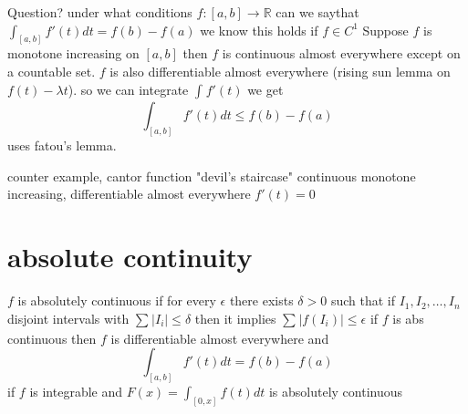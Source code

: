 \documentclass[11pt]{article}
\begin{document}
Question? under what conditions $f : [a,b] \rightarrow \mathbb{R}$ can we saythat $\int_{[a,b]}^{}f'(t)dt = f(b) - f(a)$ we know this holds if $f \in C^{1}$
Suppose $f$ is monotone increasing on $[a,b]$ then  $f$ is continuous almost everywhere except on a countable set. $f$ is also differentiable almost everywhere (rising sun lemma on $f(t) - \lambda t$).
so we can integrate $\int_{}^{}f'(t)$ we get
\[
    \int_{[a,b]}^{}f'(t)dt \le f(b) - f(a)
\] 
uses fatou's lemma.

counter example, cantor function "devil's staircase" continuous monotone increasing, differentiable almost everywhere  $f'(t) = 0$

\section{absolute continuity}
$f$ is absolutely continuous if for every $\epsilon$ there exists $\delta > 0$ such that if $I_1,I_2,\dots,I_n$ disjoint intervals
with $\sum_{}^{}|I_i| \le \delta$ then it implies $\sum_{}^{}|f(I_i)| \le \epsilon$
if $f$ is abs continuous then $f$ is differentiable almost everywhere and
\[
    \int_{[a,b]}^{}f'(t)dt = f(b) - f(a)
\] 
if $f$ is integrable and $F(x) = \int_{[0,x]}^{}f(t)dt$ is absolutely continuous
\end{document}
